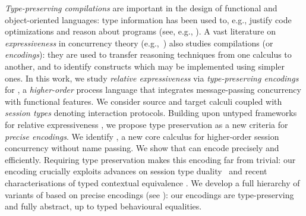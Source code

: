 \documentclass[runningheads]{llncs}
\begin{document}
\emph{Type-preserving compilations} are important in the design of
functional and object-oriented languages: type information has been
used to, e.g., justify code optimizations and reason about programs
(see, e.g.,
\cite{DBLP:journals/toplas/MorrisettWCG99,DBLP:conf/pldi/ShaoA95,DBLP:journals/toplas/LeagueST02}).
A vast literature on 
{\em expressiveness} 
in concurrency theory  
(e.g.,~\cite{Palamidessi03,DBLP:journals/iandc/Gorla10,DBLP:journals/tcs/FuL10,DBLP:conf/icalp/LanesePSS10,DBLP:journals/corr/PetersG15})
also studies compilations (or \emph{encodings}):
they are used to transfer reasoning techniques 
from one calculus to another, and to identify 
constructs which may be implemented
using simpler ones. 
In this work, we study 
{\em relative expressiveness} 
via \emph{type-preserving encodings} for \HOp, a \emph{higher-order} 
process language that integrates message-passing concurrency with functional features.
We consider source and target calculi coupled with \emph{session types} denoting interaction protocols. 
Building upon untyped frameworks for relative expressiveness
\cite{DBLP:journals/iandc/Gorla10}, 
we propose type preservation as a {new criteria} for \emph{precise encodings}.
We identify \HO, a new core calculus for higher-order session concurrency without
name passing. 
We show that \HO can encode \HOp precisely and efficiently. 
Requiring  
type preservation makes
this encoding far from trivial: our encoding crucially exploits advances on
session type duality~\cite{TGC14,DBLP:journals/corr/abs-1202-2086} and recent
characterisations of typed contextual equivalence \cite{characteristic_bis}.
We develop a full hierarchy of variants of \HOp based on 
precise encodings (see ):
our encodings are
type-preserving and fully abstract, up to typed
behavioural equalities. 
\end{document}
